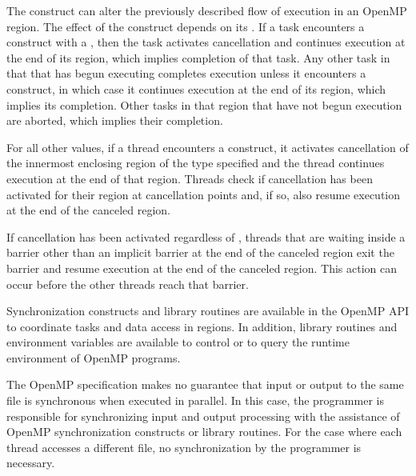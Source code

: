 
The  construct can alter the previously described flow of execution in an
OpenMP region. The effect of the  construct depends on its
. If a task encounters a 
construct with a 
, then the task activates cancellation
and continues execution at the end of its
 region, which implies completion of that task.
Any other task in that 
that has begun executing completes execution unless it encounters a 
 construct, in which case it continues execution at the end of its  region,
which implies its completion. Other tasks in that  region that have not
begun execution are aborted, which implies their completion.

For all other  values, if a
thread encounters a  construct, it
activates cancellation of the innermost enclosing region of the type specified and the
thread continues execution at the end of that region. Threads check if cancellation has
been activated for their region at cancellation points and, if so, also resume execution at
the end of the canceled region.

If cancellation has been activated regardless of ,
threads that are
waiting inside a barrier other than an implicit barrier at the end of the canceled region
exit the barrier and resume execution at the end of the canceled region. This action can
occur before the other threads reach that barrier.

Synchronization constructs and library routines are available in the OpenMP API to
coordinate tasks and data access in  regions. In addition, library routines and
environment variables are available to control or to query the runtime environment of
OpenMP programs.

The OpenMP specification makes no guarantee that input or output to the same file is
synchronous when executed in parallel. In this case, the programmer is responsible for
synchronizing input and output processing with the assistance of OpenMP
synchronization constructs or library routines. For the case where each thread accesses a
different file, no synchronization by the programmer is necessary.
